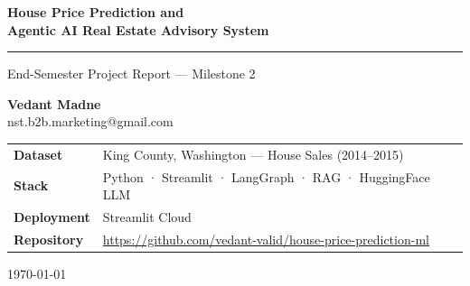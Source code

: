 \documentclass[12pt, a4paper]{article}
\begin{document}
\begin{titlepage}
  \centering
  \vspace*{1.5cm}

  {\fontsize{22}{28}\selectfont\bfseries\color{primary}
    House Price Prediction and\\[0.4em]
    Agentic AI Real Estate Advisory System
  }

  \vspace{0.8cm}
  \rule{0.6\linewidth}{1.2pt}
  \vspace{0.8cm}

  {\large\color{gray} End-Semester Project Report --- Milestone 2}

  \vspace{1.5cm}

  {\large \textbf{Vedant Madne}}\\[0.3em]
  {\normalsize nst.b2b.marketing@gmail.com}

  \vspace{2.5cm}

  \begin{tabular}{ll}
    \textbf{Dataset}    & King County, Washington --- House Sales (2014--2015) \\[4pt]
    \textbf{Stack}      & Python · Streamlit · LangGraph · RAG · HuggingFace LLM \\[4pt]
    \textbf{Deployment} & Streamlit Cloud \\[4pt]
    \textbf{Repository} & \url{https://github.com/vedant-valid/house-price-prediction-ml} \\
  \end{tabular}

  \vfill
  {\small \today}
\end{titlepage}

\begin{abstract}
\noindent
This report documents the design, implementation, and evaluation of a two-phase
real estate intelligence system built for King County, Washington. The first phase
applies classical supervised machine learning --- Linear Regression, Random Forest,
and XGBoost --- to predict residential sale prices from 18 property features across
4,600 transactions. After log-transforming the target and applying standard
preprocessing, Linear Regression achieved the best generalisation
($R^2 = 0.80$, $\text{MAE} = \$81{,}492$), confirming that log-price in this dataset
is largely additive.

The second phase extends the predictor into a full \textit{agentic AI advisory assistant}.
Using LangGraph for multi-step workflow orchestration, a TF-IDF retrieval module for
Retrieval-Augmented Generation (RAG) over a curated market knowledge base, and a
large language model (Qwen-2.5-72B) for structured report generation, the system
autonomously analyses a property, retrieves relevant market trends, finds comparable
sales, and produces a grounded BUY / HOLD / AVOID investment recommendation. Responsible
AI practices --- including RAG grounding to prevent hallucination and a mandatory
disclaimer --- are embedded throughout the pipeline.
\end{abstract}
\end{document}
